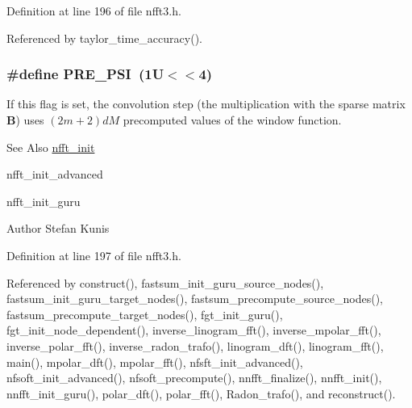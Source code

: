 Definition at line 196 of file nfft3.\-h.



Referenced by taylor\-\_\-time\-\_\-accuracy().

\hypertarget{group__nfft_ga959463a5c7723ccef5057ddcb784b40c}{
\subsubsection[{P\-R\-E\-\_\-\-P\-S\-I}]{\setlength{\rightskip}{0pt plus 5cm}\#define P\-R\-E\-\_\-\-P\-S\-I~(1\-U$<$$<$4)}}\label{group__nfft_ga959463a5c7723ccef5057ddcb784b40c}
If this flag is set, the convolution step (the multiplication with the sparse matrix $\mathbf{B}$) uses $(2m+2)dM$ precomputed values of the window function.

\begin{DoxySeeAlso}{See Also}
\hyperlink{group__nfft_ga1dfeaf18f3735f035afa62ca768d99c4}{nfft\-\_\-init} 

nfft\-\_\-init\-\_\-advanced 

nfft\-\_\-init\-\_\-guru 
\end{DoxySeeAlso}
\begin{DoxyAuthor}{Author}
Stefan Kunis 
\end{DoxyAuthor}


Definition at line 197 of file nfft3.\-h.



Referenced by construct(), fastsum\-\_\-init\-\_\-guru\-\_\-source\-\_\-nodes(), fastsum\-\_\-init\-\_\-guru\-\_\-target\-\_\-nodes(), fastsum\-\_\-precompute\-\_\-source\-\_\-nodes(), fastsum\-\_\-precompute\-\_\-target\-\_\-nodes(), fgt\-\_\-init\-\_\-guru(), fgt\-\_\-init\-\_\-node\-\_\-dependent(), inverse\-\_\-linogram\-\_\-fft(), inverse\-\_\-mpolar\-\_\-fft(), inverse\-\_\-polar\-\_\-fft(), inverse\-\_\-radon\-\_\-trafo(), linogram\-\_\-dft(), linogram\-\_\-fft(), main(), mpolar\-\_\-dft(), mpolar\-\_\-fft(), nfsft\-\_\-init\-\_\-advanced(), nfsoft\-\_\-init\-\_\-advanced(), nfsoft\-\_\-precompute(), nnfft\-\_\-finalize(), nnfft\-\_\-init(), nnfft\-\_\-init\-\_\-guru(), polar\-\_\-dft(), polar\-\_\-fft(), Radon\-\_\-trafo(), and reconstruct().

